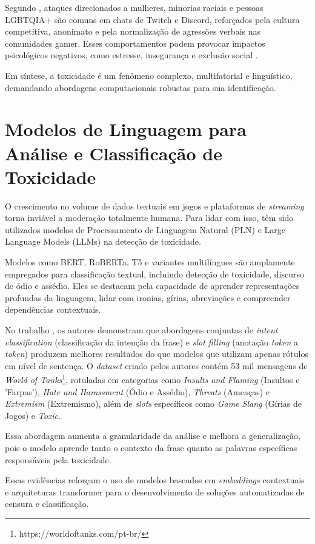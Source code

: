 \documentclass{eic-bcc-tcc}
\begin{document}
Segundo \cite{sbgames}, ataques direcionados a mulheres, minorias raciais e pessoas LGBTQIA+ são comuns em chats de Twitch e Discord, reforçados pela cultura competitiva, anonimato e pela normalização de agressões verbais nas comunidades gamer. Esses comportamentos podem provocar impactos psicológicos negativos, como estresse, insegurança e exclusão social .

Em síntese, a toxicidade é um fenômeno complexo, multifatorial e linguístico, demandando abordagens computacionais robustas para sua identificação.

\section{Modelos de Linguagem para Análise e Classificação de Toxicidade}

O crescimento no volume de dados textuais em jogos e plataformas de \textit{streaming} torna inviável a moderação totalmente humana. Para lidar com isso, têm sido utilizados modelos de Processamento de Linguagem Natural (PLN) e Large Language Models (LLMs) na detecção de toxicidade.

Modelos como BERT, RoBERTa, T5 e variantes multilíngues são amplamente empregados para classificação textual, incluindo detecção de toxicidade, discurso de ódio e assédio. Eles se destacam pela capacidade de aprender representações profundas da linguagem, lidar com ironias, gírias, abreviações e compreender dependências contextuais.

No trabalho \cite{naseem-etal-2025-gametox}, os autores demonstram que abordagens conjuntas de \textit{intent classification} (classificação da intenção da frase) e \textit{slot filling} (anotação \textit{token} a \textit{token}) produzem melhores resultados do que modelos que utilizam apenas rótulos em nível de sentença. O \textit{dataset} criado pelos autores contém 53 mil mensagens de \textit{World of Tanks}\footnote{https://worldoftanks.com/pt-br/}, rotuladas em categorias como \textit{Insults and Flaming} (Insultos e 'Farpas'), \textit{Hate and Harassment} (Ódio e Assédio), \textit{Threats} (Ameaças) e \textit{Extremism} (Extremismo), além de \textit{slots} específicos como \textit{Game Slang} (Gírias de Jogos) e \textit{Toxic}.

Essa abordagem aumenta a granularidade da análise e melhora a generalização, pois o modelo aprende tanto o contexto da frase quanto as palavras específicas responsáveis pela toxicidade.

Essas evidências reforçam o uso de modelos baseados em \textit{embeddings} contextuais e arquiteturas transformer para o desenvolvimento de soluções automatizadas de censura e classificação.
\end{document}
